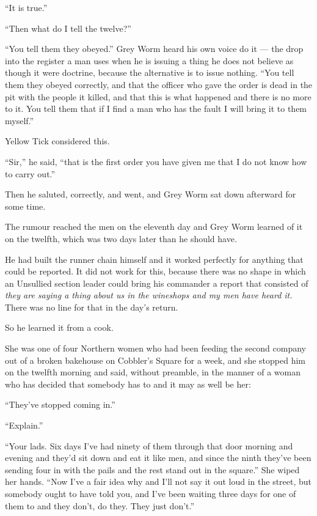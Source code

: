 “It is true.”

“Then what do I tell the twelve?”

“You tell them they obeyed.” Grey Worm heard his own voice do it — the drop into the register a man uses when he is issuing a thing he does not believe as though it were doctrine, because the alternative is to issue nothing. “You tell them they obeyed correctly, and that the officer who gave the order is dead in the pit with the people it killed, and that this is what happened and there is no more to it. You tell them that if I find a man who has the fault I will bring it to them myself.”

Yellow Tick considered this.

“Sir,” he said, “that is the first order you have given me that I do not know how to carry out.”

Then he saluted, correctly, and went, and Grey Worm sat down afterward for some time.

\sceneBreak

The rumour reached the men on the eleventh day and Grey Worm learned of it on the twelfth, which was two days later than he should have.

He had built the runner chain himself and it worked perfectly for anything that could be reported. It did not work for this, because there was no shape in which an Unsullied section leader could bring his commander a report that consisted of \textit{they are saying a thing about us in the wineshops and my men have heard it.} There was no line for that in the day’s return.

So he learned it from a cook.

She was one of four Northern women who had been feeding the second company out of a broken bakehouse on Cobbler’s Square for a week, and she stopped him on the twelfth morning and said, without preamble, in the manner of a woman who has decided that somebody has to and it may as well be her:

“They’ve stopped coming in.”

“Explain.”

“Your lads. Six days I’ve had ninety of them through that door morning and evening and they’d sit down and eat it like men, and since the ninth they’ve been sending four in with the pails and the rest stand out in the square.” She wiped her hands. “Now I’ve a fair idea why and I’ll not say it out loud in the street, but somebody ought to have told you, and I’ve been waiting three days for one of them to and they don’t, do they. They just don’t.”

